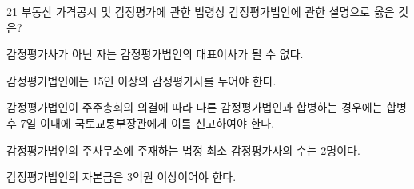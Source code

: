 \begin{question}{21}
부동산 가격공시 및 감정평가에 관한 법령상 감정평가법인에 관한 설명으로 옳은 것은?
\begin{choices}
  \item 감정평가사가 아닌 자는 감정평가법인의 대표이사가 될 수 없다.
  \item 감정평가법인에는 15인 이상의 감정평가사를 두어야 한다.
  \item 감정평가법인이 주주총회의 의결에 따라 다른 감정평가법인과 합병하는 경우에는 합병 후 7일 이내에 국토교통부장관에게 이를 신고하여야 한다.
  \item 감정평가법인의 주사무소에 주재하는 법정 최소 감정평가사의 수는 2명이다.
  \item 감정평가법인의 자본금은 3억원 이상이어야 한다.
\end{choices}
\end{question}
